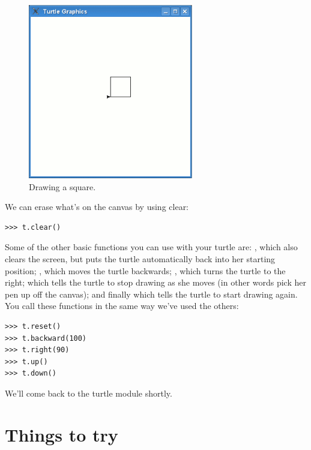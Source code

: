 \begin{figure}
\begin{center}
\includegraphics[width=72mm]{eps/figure16.eps}
\end{center}
\caption{Drawing a square.}\label{fig16}
\end{figure}

We can erase what's on the canvas by using clear:

\begin{listing}
\begin{verbatim}
>>> t.clear()
\end{verbatim}
\end{listing}

Some of the other basic functions you can use with your turtle are: , which also clears the screen, but puts the turtle automatically back into her starting position; , which moves the turtle backwards; , which turns the turtle to the right;  which tells the turtle to stop drawing as she moves (in other words pick her pen up off the canvas); and finally  which tells the turtle to start drawing again. You call these functions in the same way we've used the others:

\begin{listing}
\begin{verbatim}
>>> t.reset()
>>> t.backward(100)
>>> t.right(90)
>>> t.up()
>>> t.down()
\end{verbatim}
\end{listing}

\noindent
We'll come back to the turtle module shortly.

\section{Things to try}

